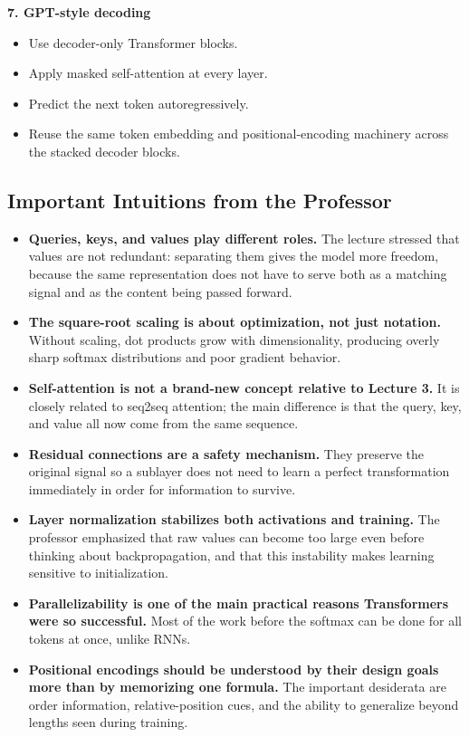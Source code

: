 \documentclass[11pt]{article}
\begin{document}
\textbf{7. GPT-style decoding}
\begin{itemize}
    \item Use decoder-only Transformer blocks.
    \item Apply masked self-attention at every layer.
    \item Predict the next token autoregressively.
    \item Reuse the same token embedding and positional-encoding machinery across the stacked decoder blocks.
\end{itemize}

\subsection{Important Intuitions from the Professor}
\begin{itemize}
    \item \textbf{Queries, keys, and values play different roles.} The lecture stressed that values are not redundant: separating them gives the model more freedom, because the same representation does not have to serve both as a matching signal and as the content being passed forward.
    \item \textbf{The square-root scaling is about optimization, not just notation.} Without scaling, dot products grow with dimensionality, producing overly sharp softmax distributions and poor gradient behavior.
    \item \textbf{Self-attention is not a brand-new concept relative to Lecture 3.} It is closely related to seq2seq attention; the main difference is that the query, key, and value all now come from the same sequence.
    \item \textbf{Residual connections are a safety mechanism.} They preserve the original signal so a sublayer does not need to learn a perfect transformation immediately in order for information to survive.
    \item \textbf{Layer normalization stabilizes both activations and training.} The professor emphasized that raw values can become too large even before thinking about backpropagation, and that this instability makes learning sensitive to initialization.
    \item \textbf{Parallelizability is one of the main practical reasons Transformers were so successful.} Most of the work before the softmax can be done for all tokens at once, unlike RNNs.
    \item \textbf{Positional encodings should be understood by their design goals more than by memorizing one formula.} The important desiderata are order information, relative-position cues, and the ability to generalize beyond lengths seen during training.

\end{itemize}
\end{document}
